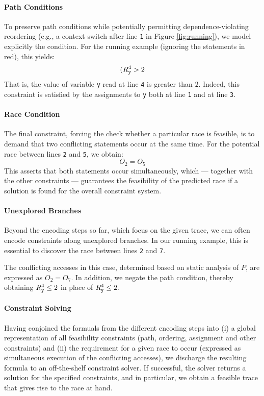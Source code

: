 \paragraph{Path Conditions} To preserve path conditions while potentially permitting dependence-violating reordering (e.g., a context switch after line {\tt 1} in Figure \ref{fig:running}), we model explicitly the condition. For the running example (ignoring the statements in red), this yields:
$$
	(R_{\tt y}^4 > 2
$$
That is, the value of variable {\tt y} read at line {\tt 4} is greater than $2$. Indeed, this constraint is satisfied by the assignments to {\tt y} both at line {\tt 1} and at line {\tt 3}.

\paragraph{Race Condition} The final constraint, forcing the check whether a particular race is feasible, is to demand that two conflicting statements occur at the same time. For the potential race between lines {\tt 2} and {\tt 5}, we obtain:
$$
	O_2 = O_5
$$ 
This asserts that both statements occur simultaneously, which --- together with the other constraints --- guarantees the feasibility of the predicted race if a solution is found for the overall constraint system.

\paragraph{Unexplored Branches} Beyond the encoding steps so far, which focus on the given trace, we can often encode constraints along unexplored branches. In our running example, this is essential to discover the race between lines {\tt 2} and {\tt 7}. 

The conflicting accesses in this case, determined based on static analysis of $P$, are expressed as $O_2=O_7$. In addition, we negate the path condition, thereby obtaining $R_{\tt y}^4 \leq 2$ in place of $R_{\tt y}^4 \leq 2$. 

\paragraph{Constraint Solving} Having conjoined the formuals from the different encoding steps into (i) a global representation of all feasibility constraints (path, ordering, assignment and other constraints) and (ii) the requirement for a given race to occur (expressed as simultaneous execution of the conflicting accesses), we discharge the resulting formula to an off-the-shelf constraint solver. If successful, the solver returns a solution for the specified constraints, and in particular, we obtain a feasible trace that gives rise to the race at hand.